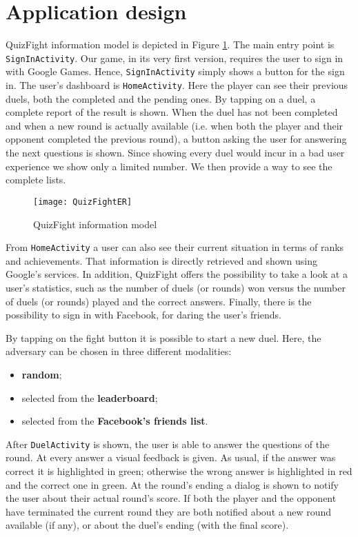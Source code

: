 \section{Application design}\label{ref:design}

QuizFight information model is depicted in Figure \ref{fig:quizfighter}.
The main entry point is \texttt{SignInActivity}.
Our game, in its very first version, requires the user to sign in with Google
Games. Hence, \texttt{SignInActivity} simply shows a button for the sign in.
The user's dashboard is \texttt{HomeActivity}.
Here the player can see their previous duels, both the completed and the
pending ones.
By tapping on a duel, a complete report of the result is shown.
When the duel has not been completed and when a new round is actually
available (i.e. when both the player and their opponent completed the
previous round), a button asking the user for answering the next questions
is shown.
Since showing every duel would incur in a bad user experience we show
only a limited number. We then provide a way to see the complete lists.

\begin{figure}[t]
	\centering
	\texttt{[image: QuizFightER]}
	\caption{QuizFight information model}
	\label{fig:quizfighter}
\end{figure}

From \texttt{HomeActivity} a user can also see their current situation in terms
of ranks and achievements.
That information is directly retrieved and shown using Google's services.
In addition, QuizFight offers the possibility to take a look at a user's
statistics, such as the number of duels (or rounds) won versus the number of
duels (or rounds) played and the correct answers.
Finally, there is the possibility to sign in with Facebook, for daring the
user's friends.

By tapping on the fight button it is possible to start a new duel.
Here, the adversary can be chosen in three different modalities:

\begin{itemize}
	\item \textbf{random};
	\item selected from the \textbf{leaderboard};
	\item selected from the \textbf{Facebook's friends list}.
\end{itemize}

After \texttt{DuelActivity} is shown, the user is able to answer the
questions of the round. At every answer a visual feedback is given.
As usual, if the answer was correct it is highlighted in green; otherwise the
wrong answer is highlighted in red and the correct one in green.
At the round's ending a dialog is shown to notify the user about their
actual round's score. If both the player and the opponent have terminated
the current round they are both notified about a new round available (if any),
or about the duel's ending (with the final score). 

